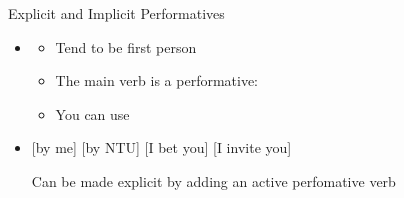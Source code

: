 \documentclass{beamer}
\begin{document}
\begin{frame}{Explicit and Implicit Performatives}
\begin{itemize}
\item {}
  \begin{itemize}
  \item Tend to be first person
  \item The main verb  is a performative: 
  \item You can use 
  \end{itemize}
\item {}
  \begin{exe}
    \ex {} [by me]
    \ex {} [by NTU]
    \ex {} [I bet you] 
    \ex {} [I invite you]
  \end{exe}
  Can be made explicit by adding an active perfomative verb
\end{itemize}

 \end{frame}


\end{document}

